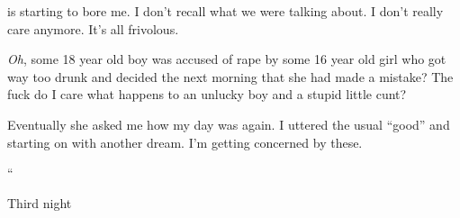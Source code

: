 \noindent
\april{} is starting to bore me.
I don't recall what we were talking about.
I don't really care anymore.  It's all frivolous.


\textit{Oh}, some 18 year old boy was accused of rape by some
16 year old girl who got way too drunk and decided the
next morning that she had made a mistake?
The fuck do I care what happens to an unlucky boy and
a stupid little cunt?


Eventually she asked me how my day was again.
I uttered the usual ``good'' and starting on with another dream.
I'm getting concerned by these.
\vspace*{3ex}


\begin{adjustwidth}{2em}{2em}
\noindent\Huge``\normalsize
\begin{adjustwidth}{1em}{1em}

\end{adjustwidth}
\end{adjustwidth}

\lhoarnob
\noindent
Third night
\lhoarb
